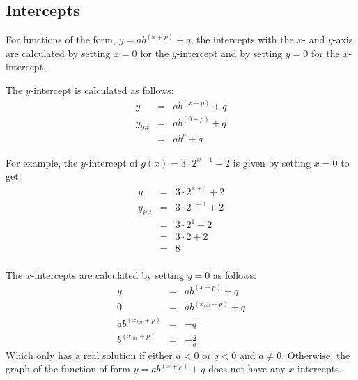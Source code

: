 
\subsection{Intercepts}
For functions of the form, $y=ab^{(x+p)} + q$, the intercepts with the $x$- and $y$-axis are calculated by setting $x=0$ for the $y$-intercept and by setting $y=0$ for the $x$-intercept.

The $y$-intercept is calculated as follows:
\begin{eqnarray}
y&=&ab^{(x+p)} + q\\
y_{int}&=&ab^{(0+p)} + q\\
&=&ab^p + q
\end{eqnarray}

For example, the $y$-intercept of $g(x)=3\cdot 2^{x+1} + 2$ is given by setting $x=0$ to get:
\begin{eqnarray*}
y&=&3\cdot 2^{x+1} + 2\\
y_{int}&=&3\cdot 2^{0+1} + 2\\
&=&3\cdot 2^{1} + 2\\
&=&3 \cdot 2 + 2\\
&=&8\\
\end{eqnarray*}

The $x$-intercepts are calculated by setting $y=0$ as follows:
\begin{eqnarray}
y&=&ab^{(x+p)} + q\\
0&=&ab^{(x_{int}+p)} + q\\
ab^{(x_{int}+p)}&=&-q\\
b^{(x_{int}+p)}&=&-\frac{q}{a}
\end{eqnarray}
Which only has a real solution if either $a<0$ or $q<0$ and $a\neq0$. Otherwise, the graph of the function of form $y=ab^{(x+p)} + q$ does not have any $x$-intercepts.

